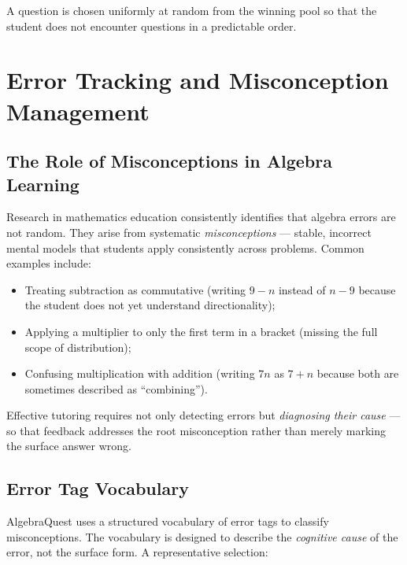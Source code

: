 \documentclass[12pt,a4paper]{article}
\begin{document}
A question is chosen uniformly at random from the winning pool so that
the student does not encounter questions in a predictable order.

\section{Error Tracking and Misconception Management}

\subsection{The Role of Misconceptions in Algebra Learning}

Research in mathematics education consistently identifies that algebra errors
are not random.  They arise from systematic \emph{misconceptions} — stable,
incorrect mental models that students apply consistently across problems.
Common examples include:

\begin{itemize}[leftmargin=1.8em]
  \item Treating subtraction as commutative (writing $9 - n$ instead of
        $n - 9$ because the student does not yet understand directionality);
  \item Applying a multiplier to only the first term in a bracket
        (missing the full scope of distribution);
  \item Confusing multiplication with addition (writing $7n$ as $7 + n$
        because both are sometimes described as ``combining'').
\end{itemize}

Effective tutoring requires not only detecting errors but
\emph{diagnosing their cause} — so that feedback addresses the root
misconception rather than merely marking the surface answer wrong.

\subsection{Error Tag Vocabulary}

AlgebraQuest uses a structured vocabulary of error tags to classify
misconceptions.  The vocabulary is designed to describe the \emph{cognitive
cause} of the error, not the surface form.  A representative selection:
\end{document}
